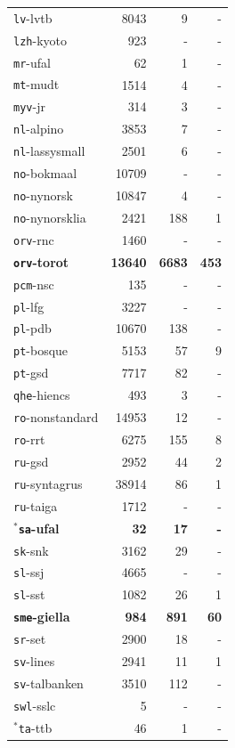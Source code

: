 \begin{table}[H]
{\begin{tabular}{|l|r|r|r|}
\texttt{lv}-lvtb & 8043 & 9 & -\\
\texttt{lzh}-kyoto & 923 & - & -\\
\texttt{mr}-ufal & 62 & 1 & -\\
\texttt{mt}-mudt & 1514 & 4 & -\\
\texttt{myv}-jr & 314 & 3 & -\\
\texttt{nl}-alpino & 3853 & 7 & -\\
\texttt{nl}-lassysmall & 2501 & 6 & -\\
\texttt{no}-bokmaal & 10709 & - & -\\
\texttt{no}-nynorsk & 10847 & 4 & -\\
\texttt{no}-nynorsklia & 2421 & 188 & 1\\
\texttt{orv}-rnc & 1460 & - & -\\
\textbf{\texttt{orv}-torot} & \textbf{13640} & \textbf{6683} & \textbf{453}\\
\texttt{pcm}-nsc & 135 & - & -\\
\texttt{pl}-lfg & 3227 & - & -\\
\texttt{pl}-pdb & 10670 & 138 & -\\
\texttt{pt}-bosque & 5153 & 57 & 9\\
\texttt{pt}-gsd & 7717 & 82 & -\\
\texttt{qhe}-hiencs & 493 & 3 & -\\
\texttt{ro}-nonstandard & 14953 & 12 & -\\
\texttt{ro}-rrt & 6275 & 155 & 8\\
\texttt{ru}-gsd & 2952 & 44 & 2\\
\texttt{ru}-syntagrus & 38914 & 86 & 1\\
\texttt{ru}-taiga & 1712 & - & -\\
\textbf{$^{*}$\texttt{sa}-ufal} & \textbf{32} & \textbf{17} & \textbf{-}\\
\texttt{sk}-snk & 3162 & 29 & -\\
\texttt{sl}-ssj & 4665 & - & -\\
\texttt{sl}-sst & 1082 & 26 & 1\\
\textbf{\texttt{sme}-giella} & \textbf{984} & \textbf{891} & \textbf{60}\\
\texttt{sr}-set & 2900 & 18 & -\\
\texttt{sv}-lines & 2941 & 11 & 1\\
\texttt{sv}-talbanken & 3510 & 112 & -\\
\texttt{swl}-sslc & 5 & - & -\\
$^{*}$\texttt{ta}-ttb & 46 & 1 & -\\

\end{tabular}}
\end{table}
